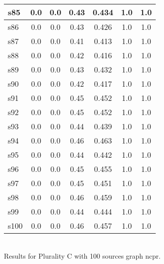 \documentclass{article}
\begin{document}
\begin{tabular}{|l|c|c|c|c|c|c|}
\hline
s85 &0.0 & 0.0 & 0.43 & 0.434 & 1.0 & 1.0\\
\hline
s86 &0.0 & 0.0 & 0.43 & 0.426 & 1.0 & 1.0\\
\hline
s87 &0.0 & 0.0 & 0.41 & 0.413 & 1.0 & 1.0\\
\hline
s88 &0.0 & 0.0 & 0.42 & 0.416 & 1.0 & 1.0\\
\hline
s89 &0.0 & 0.0 & 0.43 & 0.432 & 1.0 & 1.0\\
\hline
s90 &0.0 & 0.0 & 0.42 & 0.417 & 1.0 & 1.0\\
\hline
s91 &0.0 & 0.0 & 0.45 & 0.452 & 1.0 & 1.0\\
\hline
s92 &0.0 & 0.0 & 0.45 & 0.452 & 1.0 & 1.0\\
\hline
s93 &0.0 & 0.0 & 0.44 & 0.439 & 1.0 & 1.0\\
\hline
s94 &0.0 & 0.0 & 0.46 & 0.463 & 1.0 & 1.0\\
\hline
s95 &0.0 & 0.0 & 0.44 & 0.442 & 1.0 & 1.0\\
\hline
s96 &0.0 & 0.0 & 0.45 & 0.455 & 1.0 & 1.0\\
\hline
s97 &0.0 & 0.0 & 0.45 & 0.451 & 1.0 & 1.0\\
\hline
s98 &0.0 & 0.0 & 0.46 & 0.459 & 1.0 & 1.0\\
\hline
s99 &0.0 & 0.0 & 0.44 & 0.444 & 1.0 & 1.0\\
\hline
s100 &0.0 & 0.0 & 0.46 & 0.457 & 1.0 & 1.0\\
\hline
\end{tabular}\\

\noindent Results for Plurality C with 100 sources graph ncpr.
\end{document}
